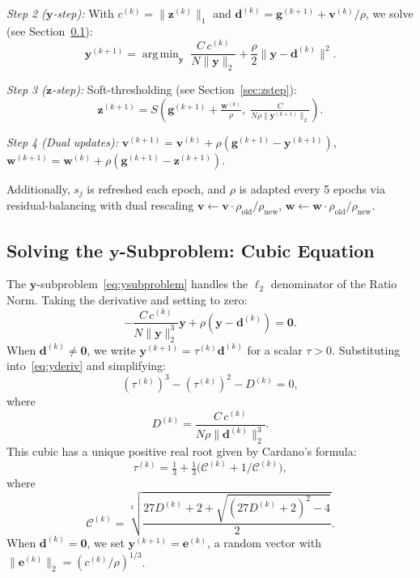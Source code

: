 \documentclass{uai2026} %
\theoremstyle{definition}
\theoremstyle{remark}
\newcommand{\bz}{\mathbf{z}}
\newcommand{\bg}{\mathbf{g}}
\newcommand{\bv}{\mathbf{v}}
\newcommand{\bw}{\mathbf{w}}
\newcommand{\by}{\mathbf{y}}
\newcommand{\bd}{\mathbf{d}}
\newcommand{\be}{\mathbf{e}}
\DeclareMathOperator*{\argmin}{arg\,min}
\begin{document}
\textit{Step 2 ($\by$-step):} With $c^{(k)} = \lVert\bz^{(k)}\rVert_1$ and $\bd^{(k)} = \bg^{(k+1)} + \bv^{(k)}/\rho$, we solve (see Section~\ref{sec:ystep}):
\begin{equation}\label{eq:ysubproblem}
    \by^{(k+1)} = \argmin_{\by}\;\frac{C\, c^{(k)}}{N\lVert\by\rVert_2}
    + \frac{\rho}{2}\lVert\by - \bd^{(k)}\rVert^2.
\end{equation}

\textit{Step 3 ($\bz$-step):} Soft-thresholding (see Section~\ref{sec:zstep}):
\begin{equation}\label{eq:zstep}
    \bz^{(k+1)} = S\!\left(\bg^{(k+1)} + \tfrac{\bw^{(k)}}{\rho},\;
    \tfrac{C}{N\rho\lVert\by^{(k+1)}\rVert_2}\right).
\end{equation}

\textit{Step 4 (Dual updates):}
$\bv^{(k+1)} = \bv^{(k)} + \rho(\bg^{(k+1)} - \by^{(k+1)})$,
$\bw^{(k+1)} = \bw^{(k)} + \rho(\bg^{(k+1)} - \bz^{(k+1)})$.

Additionally, $s_j$ is refreshed each epoch, and $\rho$ is adapted every 5 epochs via residual-balancing \citep{boyd2011admm} with dual rescaling $\bv \leftarrow \bv \cdot \rho_\text{old}/\rho_\text{new}$, $\bw \leftarrow \bw \cdot \rho_\text{old}/\rho_\text{new}$.

\subsection{Solving the $\by$-Subproblem: Cubic Equation}\label{sec:ystep}

The $\by$-subproblem~\eqref{eq:ysubproblem} handles the $\ell_2$ denominator of the Ratio Norm.
Taking the derivative and setting to zero:
\begin{equation}\label{eq:yderiv}
    -\frac{C\, c^{(k)}}{N\lVert\by\rVert_2^3}\by + \rho(\by - \bd^{(k)}) = \mathbf{0}.
\end{equation}
When $\bd^{(k)} \neq \mathbf{0}$, we write $\by^{(k+1)} = \tau^{(k)}\bd^{(k)}$ for a scalar $\tau > 0$.
Substituting into~\eqref{eq:yderiv} and simplifying:
\begin{equation}\label{eq:cubic}
    (\tau^{(k)})^3 - (\tau^{(k)})^2 - D^{(k)} = 0,
\end{equation}
where
\begin{equation}\label{eq:D}
    D^{(k)} = \frac{C\,c^{(k)}}{N\rho\lVert\bd^{(k)}\rVert_2^3}.
\end{equation}
This cubic has a unique positive real root given by Cardano's formula:
\begin{equation}\label{eq:tau}
    \tau^{(k)} = \tfrac{1}{3} + \tfrac{1}{3}\bigl(\mathcal{C}^{(k)} + 1/\mathcal{C}^{(k)}\bigr),
\end{equation}
where
\begin{equation}\label{eq:cardano}
    \mathcal{C}^{(k)} = \sqrt[3]{\frac{27D^{(k)} + 2 + \sqrt{(27D^{(k)}+2)^2 - 4}}{2}}.
\end{equation}
When $\bd^{(k)} = \mathbf{0}$, we set $\by^{(k+1)} = \be^{(k)}$, a random vector with $\lVert\be^{(k)}\rVert_2 = (c^{(k)}/\rho)^{1/3}$.
\end{document}
